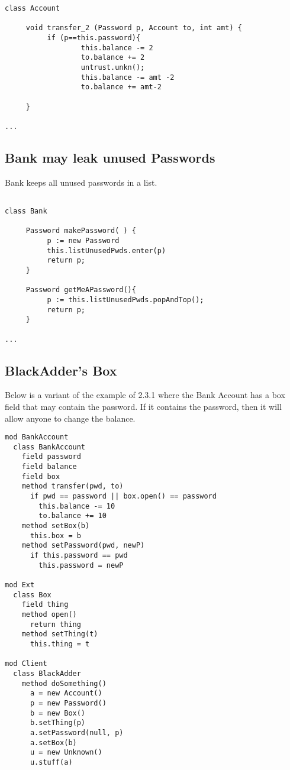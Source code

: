 \begin{lstlisting}[language=chainmail, mathescape=true, frame=lines]
class Account

     void transfer_2 (Password p, Account to, int amt) {
          if (p==this.password){
                  this.balance -= 2
                  to.balance += 2
                  untrust.unkn();
                  this.balance -= amt -2
                  to.balance += amt-2
                     
     }
     
...
\end{lstlisting}

\subsection{Bank may leak unused Passwords}
\label{s:deactivate_leak_old}

Bank keeps all unused passwords in a list. 

\begin{lstlisting}[language=chainmail, mathescape=true, frame=lines]

class Bank

     Password makePassword( ) {
          p := new Password
          this.listUnusedPwds.enter(p) 
          return p;                    
     }
     
     Password getMeAPassword(){
          p := this.listUnusedPwds.popAndTop();
          return p;
     }
     
...
\end{lstlisting}

\subsection{BlackAdder's Box}
\label{s:blackadder_box}

Below is a variant of the example of 2.3.1 where the Bank Account has a box field 
that may contain the password. If it contains the password, then it will allow anyone to change the balance.

\begin{lstlisting}[language=chainmail, mathescape=true, frame=lines]
mod BankAccount
  class BankAccount
    field password
    field balance
    field box
    method transfer(pwd, to)
      if pwd == password || box.open() == password
        this.balance -= 10
        to.balance += 10
    method setBox(b)
      this.box = b
    method setPassword(pwd, newP)
      if this.password == pwd
        this.password = newP
      
mod Ext
  class Box
    field thing
    method open()
      return thing
    method setThing(t)
      this.thing = t
    
mod Client
  class BlackAdder
    method doSomething()
      a = new Account()
      p = new Password()
      b = new Box()
      b.setThing(p)
      a.setPassword(null, p)
      a.setBox(b)
      u = new Unknown()
      u.stuff(a)
\end{lstlisting}
